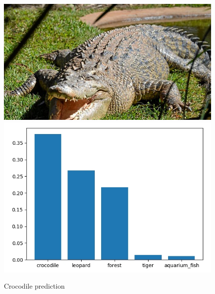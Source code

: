 \documentclass[12pt,english]{article}
\begin{document}
\begin{figure}[H]
\centering
\includegraphics[scale=0.15]{crocodile.jpg}
\hspace{2em}
\includegraphics[scale=0.5]{crocodile_prediction.jpg}
\caption{Crocodile prediction}
\end{figure}

\newpage
\end{document}

